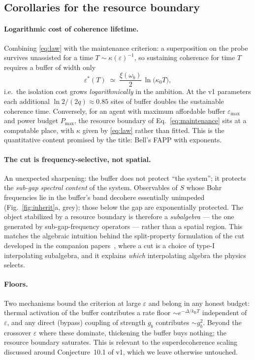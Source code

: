 \documentclass[11pt,a4paper]{article}
\theoremstyle{remark}
\newcommand{\eps}{\varepsilon}
\newcommand{\kB}{k_{\mathrm{B}}}
\begin{document}
\subsection{Corollaries for the resource boundary}

\paragraph{Logarithmic cost of coherence lifetime.}
Combining \eqref{eq:law} with the maintenance criterion: a superposition on the probe
survives unassisted for a time $T \sim \kappa(\eps)^{-1}$, so sustaining coherence for
time $T$ requires a buffer of width only
\begin{equation}
  \eps^*(T) \;\simeq\; \frac{\xi(\omega_b)}{2}\,\ln\!\big(\kappa_0 T\big),
  \label{eq:logcost}
\end{equation}
i.e.\ the isolation cost grows \emph{logarithmically} in the ambition. At the v1
parameters each additional $\ln 2/(2q) \approx 0.85$ sites of buffer doubles the
sustainable coherence time. Conversely, for an agent with maximum affordable buffer
$\eps_{\max}$ and power budget $P_{\max}$, the resource boundary of
Eq.~\eqref{eq:maintenance} sits at a computable place, with $\kappa$ given by
\eqref{eq:law} rather than fitted. This is the quantitative content promised by the title:
Bell's FAPP with exponents.

\paragraph{The cut is frequency-selective, not spatial.}
An unexpected sharpening: the buffer does not protect ``the system''; it protects the
\emph{sub-gap spectral content} of the system. Observables of $S$ whose Bohr frequencies
lie in the buffer's band decohere essentially unimpeded (Fig.~\ref{fig:inherit}a, grey);
those below the gap are exponentially protected. The object stabilized by a resource
boundary is therefore a \emph{subalgebra} --- the one generated by sub-gap-frequency
operators --- rather than a spatial region. This matches the algebraic intuition behind
the split-property formulation of the cut developed in the companion
papers~\cite{Eriksson0060,Eriksson0061}, where a cut is a choice of type-I interpolating
subalgebra, and it explains \emph{which} interpolating algebra the physics selects.

\paragraph{Floors.}
Two mechanisms bound the criterion at large $\eps$ and belong in any honest budget:
thermal activation of the buffer contributes a rate floor $\sim e^{-\Delta/\kB T}$
independent of $\eps$, and any direct (bypass) coupling of strength $g_b$ contributes
$\sim g_b^2$. Beyond the crossover $\eps$ where these dominate, thickening the buffer buys
nothing; the resource boundary saturates. This is relevant to the superdecoherence
scaling discussed around Conjecture~10.1 of v1, which we leave otherwise untouched.
\end{document}
